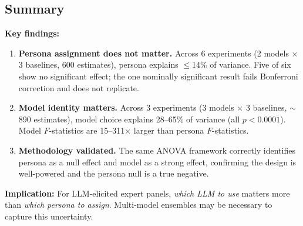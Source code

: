 \subsection{Summary}
\label{sec:persona-summary}

\textbf{Key findings:}
\begin{enumerate}
  \item \textbf{Persona assignment does not matter.} Across 6 experiments (2 models $\times$ 3 baselines, 600 estimates), persona explains $\leq$14\% of variance. Five of six show no significant effect; the one nominally significant result fails Bonferroni correction and does not replicate.

  \item \textbf{Model identity matters.} Across 3 experiments (3 models $\times$ 3 baselines, $\sim$890 estimates), model choice explains 28--65\% of variance (all $p < 0.0001$). Model $F$-statistics are 15--311$\times$ larger than persona $F$-statistics.

  \item \textbf{Methodology validated.} The same ANOVA framework correctly identifies persona as a null effect and model as a strong effect, confirming the design is well-powered and the persona null is a true negative.
\end{enumerate}

\textbf{Implication:} For LLM-elicited expert panels, \emph{which LLM to use} matters more than \emph{which persona to assign}. Multi-model ensembles may be necessary to capture this uncertainty.
